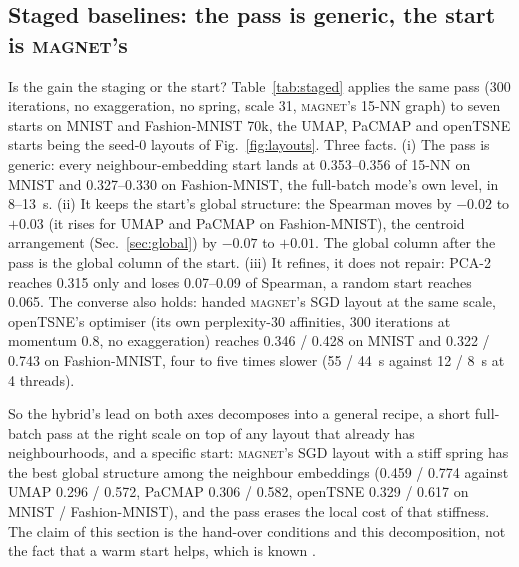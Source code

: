 \documentclass[11pt]{article}
\newcommand{\magnet}{\textsc{magnet}}
\begin{document}
\subsection{Staged baselines: the pass is generic, the start is \magnet{}'s}\label{sec:stagedbase}
Is the gain the staging or the start? Table~\ref{tab:staged} applies the same pass (300 iterations, no
exaggeration, no spring, scale 31, \magnet{}'s 15-NN graph) to seven starts on MNIST and Fashion-MNIST
70k, the UMAP, PaCMAP and openTSNE starts being the seed-0 layouts of Fig.~\ref{fig:layouts}. Three
facts. (i) The pass is generic: every neighbour-embedding start lands at 0.353--0.356 of 15-NN on MNIST
and 0.327--0.330 on Fashion-MNIST, the full-batch mode's own level, in 8--13~s. (ii) It keeps the start's
global structure: the Spearman moves by $-0.02$ to $+0.03$ (it rises for UMAP and PaCMAP on
Fashion-MNIST), the centroid arrangement (Sec.~\ref{sec:global}) by $-0.07$ to $+0.01$. The global
column after the pass is the global column of the start. (iii) It refines, it does not repair: PCA-2
reaches 0.315 only and loses 0.07--0.09 of Spearman, a random start reaches 0.065. The converse also
holds: handed \magnet{}'s SGD layout at the same scale, openTSNE's optimiser (its own perplexity-30
affinities, 300 iterations at momentum 0.8, no exaggeration) reaches 0.346 / 0.428 on MNIST and 0.322 /
0.743 on Fashion-MNIST, four to five times slower (55 / 44~s against 12 / 8~s at 4 threads).

So the hybrid's lead on both axes decomposes into a general recipe, a short full-batch pass at the right
scale on top of any layout that already has neighbourhoods, and a specific start: \magnet{}'s SGD layout
with a stiff spring has the best global structure among the neighbour embeddings (0.459 / 0.774 against
UMAP 0.296 / 0.572, PaCMAP 0.306 / 0.582, openTSNE 0.329 / 0.617 on MNIST / Fashion-MNIST), and the
pass erases the local cost of that stiffness. The claim of this section is the hand-over conditions and
this decomposition, not the fact that a warm start helps, which is known \citep{kobak2021init,
wang2021pacmap}.
\end{document}
